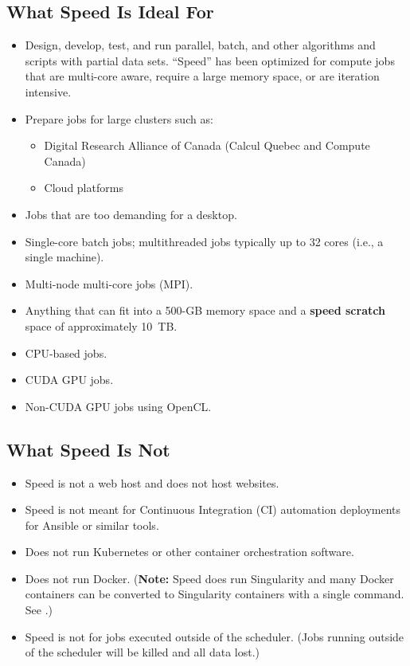 \documentclass{easychair}
\begin{document}
\subsection{What Speed Is Ideal For}
\label{sect:speed-is-for}

\begin{itemize}
	\item
	Design, develop, test, and run parallel, batch, and other algorithms and scripts with partial data sets.
	``Speed'' has been optimized for compute jobs that are multi-core aware,
	require a large memory space, or are iteration intensive.

	\item
	Prepare jobs for large clusters such as:
		\begin{itemize}
			\item Digital Research Alliance of Canada (Calcul Quebec and Compute Canada)
			\item Cloud platforms
		\end{itemize}
	\item
	Jobs that are too demanding for a desktop. 
	\item
	Single-core batch jobs; multithreaded jobs typically up to 32 cores (i.e., a single machine).
	\item
	Multi-node multi-core jobs (MPI).
	\item
	Anything that can fit into a 500-GB memory space and a \textbf{speed scratch} space of approximately 10~TB. 
	\item
	CPU-based jobs. 
	\item
	CUDA GPU jobs.
	\item
	Non-CUDA GPU jobs using OpenCL.
\end{itemize}

\subsection{What Speed Is Not}
\label{sect:speed-is-not}

\begin{itemize}
	\item Speed is not a web host and does not host websites.
	\item Speed is not meant for Continuous Integration (CI) automation deployments for Ansible or similar tools. 
	\item Does not run Kubernetes or other container orchestration software.
	\item Does not run Docker. (\textbf{Note:} Speed does run Singularity and many Docker containers can be converted to Singularity 
	containers with a single command. See .)
	\item Speed is not for jobs executed outside of the scheduler. (Jobs running outside of the scheduler will be killed and all data lost.)
\end{itemize}
\end{document}
